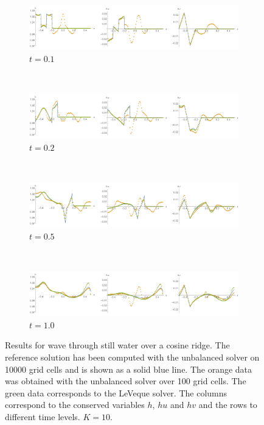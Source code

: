 \begin{figure}
  \centering
  \begin{subfigure}{\textwidth}
    \includegraphics[width=\textwidth]{diagrams/results-wave-lev-1}
    \caption{$t = 0.1$}
    \label{fig:results-wave-lev-1}
  \end{subfigure} \\
  \begin{subfigure}{\textwidth}
    \includegraphics[width=\textwidth]{diagrams/results-wave-lev-2}
    \caption{$t = 0.2$}
    \label{fig:results-wave-lev-2}
  \end{subfigure} \\
  \begin{subfigure}{\textwidth}
    \includegraphics[width=\textwidth]{diagrams/results-wave-lev-5}
    \caption{$t = 0.5$}
    \label{fig:results-wave-lev-5}
  \end{subfigure} \\
  \begin{subfigure}{\textwidth}
    \includegraphics[width=\textwidth]{diagrams/results-wave-lev-10}
    \caption{$t = 1.0$}
    \label{fig:results-wave-lev-10}
  \end{subfigure}
  \caption{Results for wave through still water over a cosine ridge. The reference solution has been computed with the unbalanced solver on 10000 grid cells and is shown as a solid blue line. The orange data was obtained with the unbalanced solver over 100 grid cells. The green data corresponds to the LeVeque solver. The columns correspond to the conserved variables $h$, $hu$ and $hv$ and the rows to different time levels. $K = 10$.}
  \label{fig:results-wave-lev}
\end{figure}

